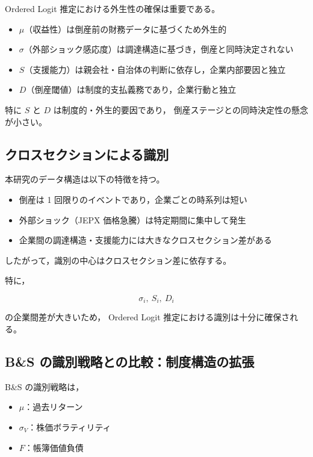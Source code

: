 Ordered Logit 推定における外生性の確保は重要である。

\begin{itemize}
    \item $\mu$（収益性）は倒産前の財務データに基づくため外生的
    \item $\sigma$（外部ショック感応度）は調達構造に基づき，倒産と同時決定されない
    \item $S$（支援能力）は親会社・自治体の判断に依存し，企業内部要因と独立
    \item $D$（倒産閾値）は制度的支払義務であり，企業行動と独立
\end{itemize}

特に $S$ と $D$ は制度的・外生的要因であり，
倒産ステージとの同時決定性の懸念が小さい。

\subsection{クロスセクションによる識別}

本研究のデータ構造は以下の特徴を持つ。

\begin{itemize}
    \item 倒産は 1 回限りのイベントであり，企業ごとの時系列は短い
    \item 外部ショック（JEPX 価格急騰）は特定期間に集中して発生
    \item 企業間の調達構造・支援能力には大きなクロスセクション差がある
\end{itemize}

したがって，識別の中心はクロスセクション差に依存する。

特に，



\[
\sigma_i,\ S_i,\ D_i
\]



の企業間差が大きいため，
Ordered Logit 推定における識別は十分に確保される。

\subsection{B\&S の識別戦略との比較：制度構造の拡張}

B\&S の識別戦略は，

\begin{itemize}
    \item $\mu$：過去リターン
    \item $\sigma_V$：株価ボラティリティ
    \item $F$：帳簿価値負債
\end{itemize}

